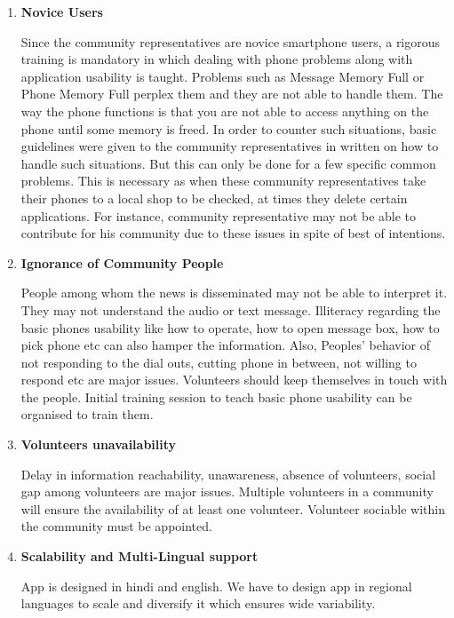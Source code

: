 \begin{itemize}
\begin {enumerate}
\item \textbf {Novice Users}

Since the community representatives are novice smartphone users, a rigorous training is mandatory in which dealing with phone problems along with application usability is taught. Problems such as Message Memory Full or Phone Memory Full perplex them and they are not able to handle them. The way the phone functions is that you are not able to access anything on the phone until some memory is freed. In order to counter such situations, basic guidelines were given to the community representatives in written on how to handle such situations. But this can only be done for a few specific common problems. This is necessary as when these community representatives take their phones to a local shop to be checked, at times they delete certain applications. For instance, community representative may not be able to contribute for his community due to these issues in spite of best of intentions.

\item \textbf{Ignorance of Community People}

People among whom the news is disseminated may not be able to interpret it. They may not understand the audio or text message.  Illiteracy regarding the basic phones usability  like how to operate, how to open message box, how to pick phone etc can also hamper the information.  Also, Peoples’  behavior of not responding to the dial outs, cutting phone  in between, not willing to respond etc are major issues. Volunteers should keep themselves in touch with the people. Initial training session to teach  basic phone usability can be organised to train them.

\item \textbf{Volunteers unavailability}

Delay in information reachability, unawareness, absence of volunteers, social gap among volunteers are major issues. Multiple volunteers in a community  will ensure the availability of at least one volunteer. Volunteer sociable within the community must be appointed.


\item \textbf{Scalability and Multi-Lingual support}

App is designed in hindi and english. We have to  design app in regional languages to scale and diversify it which ensures wide variability.
\end {enumerate}

\end{itemize}





